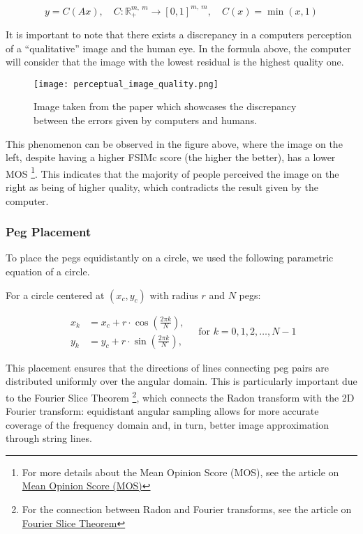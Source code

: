 \begin{equation}
y = C(Ax), \quad
C : \mathbb{R}_+^{m, \ m} \rightarrow [0, 1]^{m, \ m}, \quad
C(x) = \min(x, 1)
\label{clamping_operator}
\end{equation}

It is important to note that there exists a discrepancy in a computers perception of a \enquote{qualitative} image and the human eye. In the formula above, the computer will consider that the image with the lowest residual is the highest quality one.

\begin{figure}[H]
    \centering
    \texttt{[image: perceptual\_image\_quality.png]}
    \caption{Image taken from the paper \cite{perceptual_image_quality} which showcases the discrepancy between the errors given by computers and humans.}
    \label{fig:perceptual_image_quality}
\end{figure}

This phenomenon can be observed in the figure above, where the image on the left, despite having a higher FSIMc score \cite{fsimc} (the higher the better), has a lower MOS \footnote{For more details about the Mean Opinion Score (MOS), see the article on \href{https://en.wikipedia.org/wiki/Mean_opinion_score}{Mean Opinion Score (MOS)}}. This indicates that the majority of people perceived the image on the right as being of higher quality, which contradicts the result given by the computer.

\subsubsection{Peg Placement}

To place the pegs equidistantly on a circle, we used the following parametric equation of a circle.

For a circle centered at \((x_c, y_c)\) with radius \(r\) and \(N\) pegs:

\[
\begin{aligned}
x_k &= x_c + r \cdot \cos\left( \frac{2\pi k}{N} \right), \\
y_k &= y_c + r \cdot \sin\left( \frac{2\pi k}{N} \right),
\end{aligned}
\quad \text{for } k = 0, 1, 2, \dots, N - 1
\]

This placement ensures that the directions of lines connecting peg pairs are distributed uniformly over the angular domain. This is particularly important due to the Fourier Slice Theorem \footnote{For the connection between Radon and Fourier transforms, see the article on \href{https://en.wikipedia.org/wiki/Projection-slice_theorem}{Fourier Slice Theorem}}, which connects the Radon transform with the 2D Fourier transform: equidistant angular sampling allows for more accurate coverage of the frequency domain and, in turn, better image approximation through string lines.

